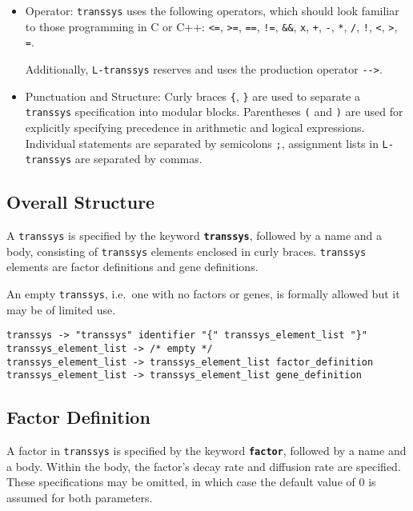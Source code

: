 \documentclass[12pt]{article}
\newcommand{\transsys}{\texttt{transsys}}
\newcommand{\ltranssys}{\texttt{L-}\transsys}
\newcommand{\keyword}[1]{\textbf{\texttt{#1}}}
\begin{document}
\begin{itemize}
\item Operator: \transsys{} uses the following operators, which should
  look familiar to those programming in C or C++: \verb|<=|, \verb|>=|,
  \verb|==|, \verb|!=|, \verb|&&|, \verb|x|, \verb|+|, \verb|-|,
  \verb|*|, \verb|/|, \verb|!|, \verb|<|, \verb|>|, \verb|=|.
  
  Additionally, \ltranssys{} reserves and uses the production operator
  \verb|-->|.
  
\item Punctuation and Structure: Curly braces \verb|{|, \verb|}| are
  used to separate a \transsys{} specification into modular
  blocks. Parentheses \verb|(| and \verb|)| are used for explicitly
  specifying precedence in arithmetic and logical
  expressions. Individual statements are separated by semicolons
  \verb|;|, assignment lists in \ltranssys{} are separated by commas.

\end{itemize}


\subsection{Overall Structure}

A \transsys{} is specified by the keyword \keyword{transsys}, followed
by a name and a body, consisting of \transsys{} elements enclosed in
curly braces. \transsys{} elements are factor definitions and gene
definitions.

An empty \transsys{}, i.e.\ one with no factors or genes, is formally
allowed but it may be of limited use.

\begin{footnotesize}
\begin{verbatim}
transsys -> "transsys" identifier "{" transsys_element_list "}"
transsys_element_list -> /* empty */
transsys_element_list -> transsys_element_list factor_definition
transsys_element_list -> transsys_element_list gene_definition
\end{verbatim}
\end{footnotesize}


\subsection{Factor Definition}

A factor in \transsys{} is specified by the keyword \keyword{factor},
followed by a name and a body. Within the body, the factor's decay
rate and diffusion rate are specified. These specifications may be
omitted, in which case the default value of 0 is assumed for both
parameters.
\end{document}

